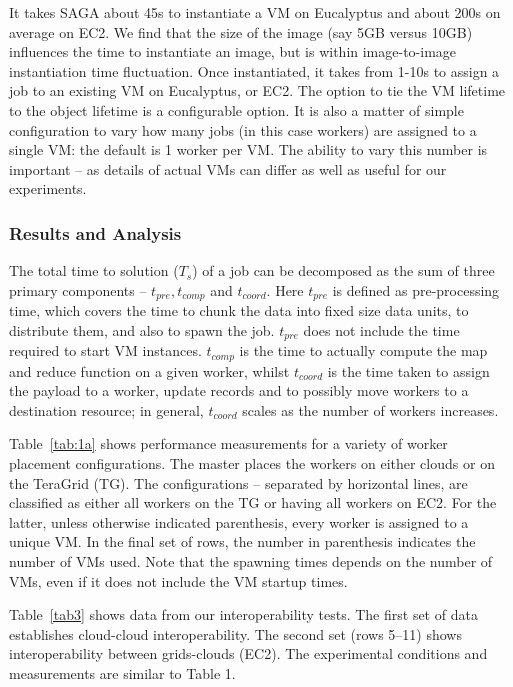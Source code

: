 \documentclass[3p,twocolumn]{elsarticle}
\begin{document}
It takes SAGA about 45s to instantiate a VM on Eucalyptus and about
200s on average on EC2.  We find that the size of the image (say 5GB
versus 10GB) influences the time to instantiate an image, but is
within image-to-image instantiation time fluctuation.  Once
instantiated, it takes from 1-10s to assign a job to an existing VM on
Eucalyptus, or EC2.  The option to tie the VM lifetime to the
 object lifetime is a configurable option.  It
is also a matter of simple configuration to vary how many jobs (in
this case workers) are assigned to a single VM:  the default is 1
worker per VM.  The ability to vary this number is important -- as
details of actual VMs can differ as well as useful for our
experiments.


\subsubsection*{Results and Analysis}

The total time to solution ($T_s$) of a \sagamapreduce job can be
decomposed as the sum of three primary components -- $t_{pre},
t_{comp}$ and $t_{coord}$.  Here $t_{pre}$ is defined as
pre-processing time, which covers the time to chunk the data into
fixed size data units, to distribute them, and also to spawn the job.
$t_{pre}$ does not include the time required to start VM instances.
$t_{comp}$ is the time to actually compute the map and reduce function
on a given worker, whilst $t_{coord}$ is the time taken to assign the
payload to a worker, update records and to possibly move workers to a
destination resource; in general, $t_{coord}$ scales as the number of
workers increases.

Table~\ref{tab:1a} shows performance measurements for a variety of
worker placement configurations.  The master places the workers on
either clouds or on the TeraGrid (TG). The configurations -- separated
by horizontal lines, are classified as either all workers on the TG or
having all workers on EC2. For the latter, unless otherwise indicated
parenthesis, every worker is assigned to a unique VM. In the final set
of rows, the number in parenthesis indicates the number of VMs used.
Note that the spawning times depends on the number of VMs, even if it
does not include the VM startup times.  


Table~\ref{tab3} shows data from our interoperability tests.  The
first set of data establishes cloud-cloud interoperability. The second
set (rows 5--11) shows interoperability between grids-clouds (EC2).
The experimental conditions and measurements are similar to Table 1.
\end{document}
